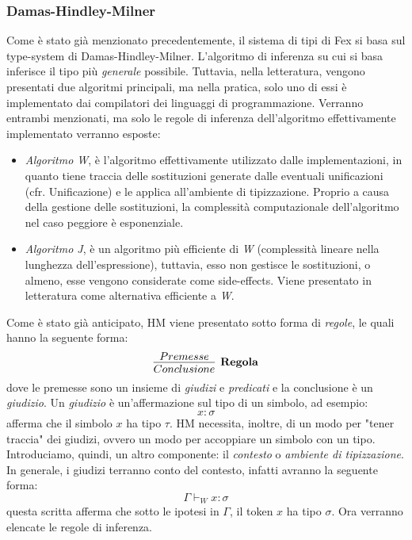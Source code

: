 \documentclass[10pt,a4paper]{article}
\begin{document}
\subsubsection{Damas-Hindley-Milner}
Come è stato già menzionato precedentemente, il sistema di tipi di Fex si basa sul type-system di Damas-Hindley-Milner.
L'algoritmo di inferenza su cui si basa inferisce il tipo più \textit{generale} possibile. Tuttavia, nella letteratura,
vengono presentati due algoritmi principali, ma nella pratica, solo uno di essi è implementato dai compilatori dei
linguaggi di programmazione. Verranno entrambi menzionati, ma solo le regole di inferenza dell'algoritmo effettivamente
implementato verranno esposte:
\begin{itemize}
    \item \textit{Algoritmo W}, è l'algoritmo effettivamente utilizzato dalle implementazioni, in quanto tiene traccia
    delle sostituzioni generate dalle eventuali unificazioni (cfr. Unificazione) e le applica all'ambiente di
    tipizzazione. Proprio a causa della gestione delle sostituzioni, la complessità computazionale dell'algoritmo
    nel caso peggiore è esponenziale.
    \item \textit{Algoritmo J}, è un algoritmo più efficiente di \textit{W} (complessità lineare nella lunghezza
    dell'espressione),
    tuttavia, esso non gestisce le sostituzioni, o almeno, esse vengono considerate come side-effects. Viene
    presentato in letteratura come alternativa efficiente a \textit{W}.
\end{itemize}

Come è stato già anticipato, HM viene presentato sotto forma di \textit{regole}, le quali hanno la seguente forma:
\newline
\[ \infer[\textbf{Regola}]{Conclusione}{Premesse} \]
dove le premesse sono un insieme di \textit{giudizi} e \textit{predicati} e la conclusione è un \textit{giudizio}. Un
\textit{giudizio} è un'affermazione sul tipo di un simbolo, ad esempio:
\[ x : \sigma \]
afferma che il simbolo $ x $ ha tipo $ \tau $. HM necessita, inoltre, di un modo per "tener traccia" dei giudizi,
ovvero un modo per accoppiare un simbolo con un tipo. Introduciamo, quindi,
un altro componente: il \textit{contesto} o \textit{ambiente di tipizzazione}. In generale, i giudizi terranno conto
del contesto, infatti avranno la seguente forma:
\[ \Gamma \vdash_W x : \sigma \]
questa scritta afferma che sotto le ipotesi in $ \Gamma $, il token $ x $ ha tipo $ \sigma $.
Ora verranno elencate le regole di inferenza.
\end{document}
